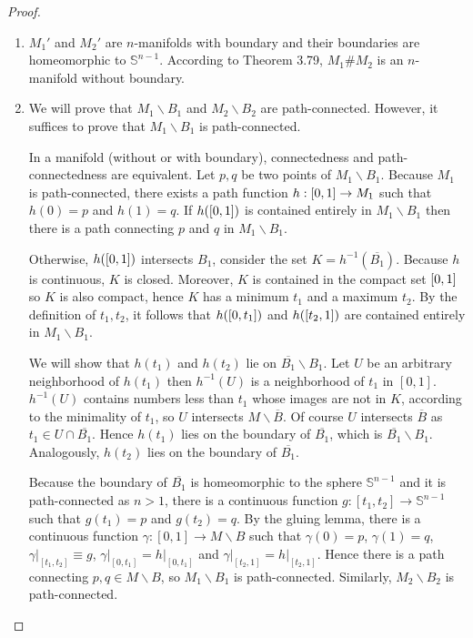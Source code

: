 \begin{proof}
	\begin{enumerate}[label={(\alph*)}]
		\item $M_{1}'$ and $M_{2}'$ are $n$-manifolds with boundary and their boundaries are homeomorphic to $\mathbb{S}^{n-1}$. According to Theorem 3.79, $M_{1} \# M_{2}$ is an $n$-manifold without boundary.
		\item We will prove that $M_{1}\smallsetminus B_{1}$ and $M_{2}\smallsetminus B_{2}$ are path-connected. However, it suffices to prove that $M_{1}\smallsetminus B_{1}$ is path-connected.

		      In a manifold (without or with boundary), connectedness and path-connectedness are equivalent. Let $p, q$ be two points of $M_{1}\smallsetminus B_{1}$. Because $M_{1}$ is path-connected, there exists a path function $h: \left[{0, 1}\right] \to M_{1}$ such that $h(0) = p$ and $h(1) = q$. If $h(\left[{0, 1}\right])$ is contained entirely in $M_{1}\smallsetminus B_{1}$ then there is a path connecting $p$ and $q$ in $M_{1}\smallsetminus B_{1}$.

		      Otherwise, $h(\left[{0, 1}\right])$ intersects $B_{1}$, consider the set $K = h^{-1}(\overline{B_{1}})$. Because $h$ is continuous, $K$ is closed. Moreover, $K$ is contained in the compact set $\left[{0, 1}\right]$ so $K$ is also compact, hence $K$ has a minimum $t_{1}$ and a maximum $t_{2}$. By the definition of $t_{1}, t_{2}$, it follows that $h(\left[{0, t_{1}}\right])$ and $h(\left[{t_{2}, 1}\right])$ are contained entirely in $M_{1}\smallsetminus B_{1}$.

		      We will show that $h(t_{1})$ and $h(t_{2})$ lie on $\overline{B_{1}}\smallsetminus B_{1}$. Let $U$ be an arbitrary neighborhood of $h(t_{1})$ then $h^{-1}(U)$ is a neighborhood of $t_{1}$ in $[0, 1]$. $h^{-1}(U)$ contains numbers less than $t_{1}$ whose images are not in $K$, according to the minimality of $t_{1}$, so $U$ intersects $M\smallsetminus \overline{B}$. Of course $U$ intersects $\overline{B}$ as $t_{1} \in U \cap \overline{B_{1}}$. Hence $h(t_{1})$ lies on the boundary of $\overline{B_{1}}$, which is $\overline{B_{1}}\smallsetminus B_{1}$. Analogously, $h(t_{2})$ lies on the boundary of $\overline{B_{1}}$.

		      Because the boundary of $\overline{B_{1}}$ is homeomorphic to the sphere $\mathbb{S}^{n-1}$ and it is path-connected as $n > 1$, there is a continuous function $g: [t_{1}, t_{2}] \to \mathbb{S}^{n-1}$ such that $g(t_{1}) = p$ and $g(t_{2}) = q$. By the gluing lemma, there is a continuous function $\gamma: [0, 1] \to M\smallsetminus B$ such that $\gamma(0) = p$, $\gamma(1) = q$, $\gamma\vert_{[t_{1}, t_{2}]} \equiv g$, $\gamma\vert_{[0, t_{1}]} = h\vert_{[0, t_{1}]}$ and $\gamma\vert_{[t_{2}, 1]} = h\vert_{[t_{2}, 1]}$. Hence there is a path connecting $p, q\in M\smallsetminus B$, so $M_{1}\smallsetminus B_{1}$ is path-connected. Similarly, $M_{2}\smallsetminus B_{2}$ is path-connected.


\end{enumerate}
\end{proof}
